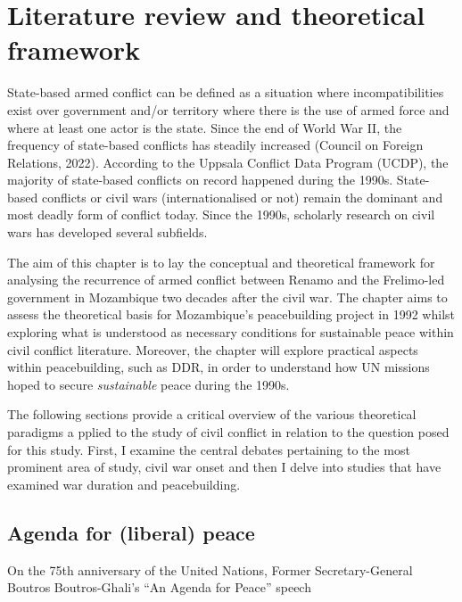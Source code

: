 \chapter{Literature review and theoretical framework}
\label{chp:Lit}

State-based armed conflict can be defined as a situation where incompatibilities exist over government and/or territory where there is the use of armed force and where at least one actor is the state. Since the end of World War II, the frequency of state-based conflicts has steadily increased (Council on Foreign Relations, 2022). According to the Uppsala Conflict Data Program (UCDP), the majority of state-based conflicts on record happened during the 1990s. State-based conflicts or civil wars (internationalised or not) remain the dominant and most deadly form of conflict today. Since the 1990s, scholarly research on civil wars has developed several subfields.

The aim of this chapter is to lay the conceptual and theoretical framework for analysing the recurrence of armed conflict between Renamo and the Frelimo-led government in Mozambique two decades after the civil war. The chapter aims to assess the theoretical basis for Mozambique's peacebuilding project in 1992 whilst exploring what is understood as necessary conditions for sustainable peace within civil conflict literature. Moreover, the chapter will explore practical aspects within peacebuilding, such as DDR, in order to understand how UN missions hoped to secure \emph{sustainable} peace during the 1990s. 

The following sections provide a critical overview of the various theoretical paradigms a pplied to the study of civil conflict in relation to the question posed for this study. First, I examine the central debates pertaining to the most prominent area of study, civil war onset and then I delve into studies that have examined war duration and peacebuilding. 

\section{Agenda for (liberal) peace}

On the 75th anniversary of the United Nations, 
Former Secretary-General Boutros Boutros-Ghali's ``An Agenda for Peace'' speech










